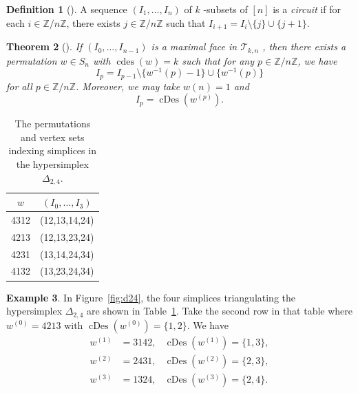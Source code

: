 \documentclass[12pt,reqno]{amsart}
\theoremstyle{plain}
\newtheorem{theorem}{Theorem}[section]
\theoremstyle{definition}
\newtheorem{definition}[theorem]{Definition}
\newtheorem{example}[theorem]{Example}
\newcommand{\Z}{\mathbb{Z}}
\newcommand{\Tri}{\mathcal{T}_{k,n}}
\DeclareMathOperator{\cDes}{cDes}
\DeclareMathOperator{\cdes}{cdes}
\begin{document}
\begin{definition}[\cite{alcove1}]
	A sequence $ (I_1,\dots,I_n) $ of $ k $ -subsets of $ [n] $
	is a \emph{circuit} if for each $ i \in \Z/n\Z $, there exists $ j \in \Z/n\Z $ such that $
		I_{i+1} = I_i \setminus \{j\} \cup \{j+1\} $.
\end{definition}

\begin{theorem}[\cite{alcove1,magicnumber}]\label{thm:max_face}
	If $ (I_0,\dots,I_{n-1}) $
	is a maximal face in $ \Tri $
, then there exists a permutation $ w \in S_n $ with $ \cdes(w) = k $ such that  for any $p \in \Z/n\Z$, we have
	\begin{equation}\label{eq:circuit}
		I_{p} = I_{p-1} \setminus \{w^{-1}(p)-1\} \cup \{w^{-1}(p)\}
	\end{equation}
	for all $p \in \Z/n\Z$. Moreover, we may take $w(n)=1$ and
	\begin{equation}\label{eq:cDescirc}
		I_p = \cDes\left(w^{(p)}\right).
	\end{equation}
\end{theorem}

\begin{table}
	\begin{tabular}{|c|c|}
		\hline
		$w$  & $(I_0,\dots,I_3)$ \\
		\hline
		4312 & (12,13,14,24)     \\
		\hline
		4213 & (12,13,23,24)     \\
		\hline
		4231 & (13,14,24,34)     \\
		\hline
		4132 & (13,23,24,34)     \\
		\hline
	\end{tabular}
	\caption{The permutations and vertex sets indexing simplices in the hypersimplex $\Delta_{2,4}$.}\label{tab:d24}
\end{table}

\begin{example}\label{ex:maxface}
	In Figure~\ref{fig:d24}, the four simplices triangulating the hypersimplex $\Delta_{2,4}$ are shown in Table~\ref{tab:d24}.
	Take the second row in that table where $w^{(0)} = 4213$ with $\cDes(w^{(0)}) = \{1,2\}$. We have
	\begin{align*}
		w^{(1)} & = 3142, & \cDes(w^{(1)}) = \{1,3\}, \\
		w^{(2)} & = 2431, & \cDes(w^{(2)}) = \{2,3\}, \\
		w^{(3)} & = 1324, & \cDes(w^{(3)}) = \{2,4\}.
	\end{align*}
\end{example}
\end{document}
